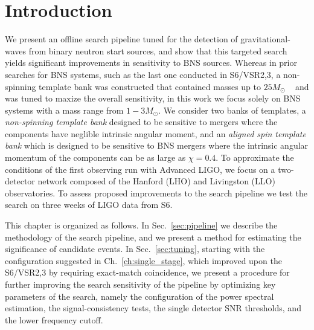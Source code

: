 


\section{Introduction}
\label{sec:introduction}

We present an offline search pipeline tuned for the detection of gravitational-waves from binary neutron start sources, and show that this targeted search yields significant improvements in sensitivity to BNS sources. Whereas in prior searches for BNS systems, such as the last one conducted in S6/VSR2,3, a non-spinning template bank was constructed that contained masses up to $25M_\odot$ ~\cite{Abadie:2011nz} and was tuned to maxize the overall sensitivity, in this work we focus solely on BNS systems with a mass range from $1-3 M_\odot$. We consider two banks of templates, a \emph{non-spinning template bank} designed to be sensitive to mergers where the components have neglible intrinsic angular moment, and an \emph{aligned spin template bank} which is designed to be sensitive to BNS mergers where the intrinsic angular momentum of the components can be as large as $\chi=0.4$. To approximate the conditions of the first observing run with Advanced LIGO, we focus on a two-detector network composed of the Hanford (LHO) and Livingston (LLO) observatories. To assess proposed improvements to the search pipeline we test the search on three weeks of LIGO data from S6.

This chapter is organized as follows. In Sec.~\ref{sec:pipeline} we describe the methodology of the search pipeline, and we present a method for estimating the significance of candidate events. In Sec.~\ref{sec:tuning}, starting with the configuration suggested in Ch.~\ref{ch:single_stage}, which improved upon the S6/VSR2,3 by requiring exact-match coincidence, we present a procedure for further improving the search sensitivity of the pipeline by optimizing key parameters of the search, namely the configuration of the power spectral estimation, the signal-consistency tests, the single detector SNR thresholds, and the lower frequency cutoff. 

